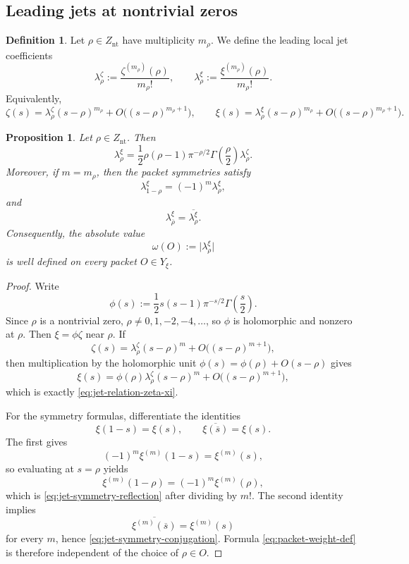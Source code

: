 \documentclass[11pt,a4paper]{article}
\newtheorem{proposition}[theorem]{Proposition}
\theoremstyle{definition}
\newtheorem{definition}[theorem]{Definition}
\theoremstyle{remark}
\begin{document}
\subsection{Leading jets at nontrivial zeros}

\begin{definition}
Let $\rho\in Z_{\mathrm{nt}}$ have multiplicity $m_\rho$.  We define the leading local jet coefficients
\[
\lambda_\rho^{\zeta}:=\frac{\zeta^{(m_\rho)}(\rho)}{m_\rho!},
\qquad
\lambda_\rho^{\xi}:=\frac{\xi^{(m_\rho)}(\rho)}{m_\rho!}.
\]
Equivalently,
\[
\zeta(s)=\lambda_\rho^{\zeta}(s-\rho)^{m_\rho}+O\bigl((s-\rho)^{m_\rho+1}\bigr),
\qquad
\xi(s)=\lambda_\rho^{\xi}(s-\rho)^{m_\rho}+O\bigl((s-\rho)^{m_\rho+1}\bigr).
\]
\end{definition}

\begin{proposition}\label{prop:leading-jets-nontrivial}
Let $\rho\in Z_{\mathrm{nt}}$.  Then
\begin{equation}\label{eq:jet-relation-zeta-xi}
\lambda_\rho^{\xi}=\frac12\rho(\rho-1)\pi^{-\rho/2}\Gamma\!\left(\frac{\rho}{2}\right)\lambda_\rho^{\zeta}.
\end{equation}
Moreover, if $m=m_\rho$, then the packet symmetries satisfy
\begin{equation}\label{eq:jet-symmetry-reflection}
\lambda_{1-\rho}^{\xi}=(-1)^m\lambda_\rho^{\xi},
\end{equation}
and
\begin{equation}\label{eq:jet-symmetry-conjugation}
\lambda_{\overline\rho}^{\xi}=\overline{\lambda_\rho^{\xi}}.
\end{equation}
Consequently, the absolute value
\begin{equation}\label{eq:packet-weight-def}
\omega(O):=\bigl|\lambda_\rho^{\xi}\bigr|
\end{equation}
is well defined on every packet $O\in Y_\xi$.
\end{proposition}

\begin{proof}
Write
\[
\phi(s):=\frac12 s(s-1)\pi^{-s/2}\Gamma\!\left(\frac{s}{2}\right).
\]
Since $\rho$ is a nontrivial zero, $\rho\neq 0,1,-2,-4,\dots$, so $\phi$ is holomorphic and nonzero at $\rho$.  Then $\xi=\phi\zeta$ near $\rho$.  If
\[
\zeta(s)=\lambda_\rho^{\zeta}(s-\rho)^m+O\bigl((s-\rho)^{m+1}\bigr),
\]
then multiplication by the holomorphic unit $\phi(s)=\phi(\rho)+O(s-\rho)$ gives
\[
\xi(s)=\phi(\rho)\lambda_\rho^{\zeta}(s-\rho)^m+O\bigl((s-\rho)^{m+1}\bigr),
\]
which is exactly \eqref{eq:jet-relation-zeta-xi}.

For the symmetry formulas, differentiate the identities
\[
\xi(1-s)=\xi(s),
\qquad
\overline{\xi(\overline s)}=\xi(s).
\]
The first gives
\[
(-1)^m\xi^{(m)}(1-s)=\xi^{(m)}(s),
\]
so evaluating at $s=\rho$ yields
\[
\xi^{(m)}(1-\rho)=(-1)^m\xi^{(m)}(\rho),
\]
which is \eqref{eq:jet-symmetry-reflection} after dividing by $m!$.  The second identity implies
\[
\overline{\xi^{(m)}(\overline s)}=\xi^{(m)}(s)
\]
for every $m$, hence \eqref{eq:jet-symmetry-conjugation}.  Formula \eqref{eq:packet-weight-def} is therefore independent of the choice of $\rho\in O$.
\end{proof}
\end{document}

